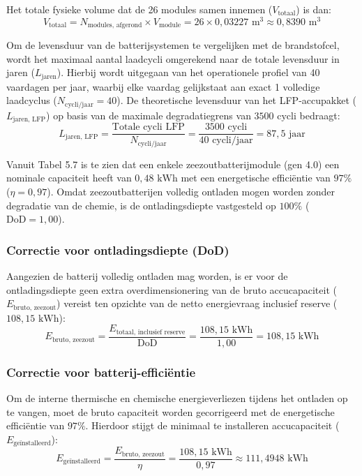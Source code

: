 \noindent Het totale fysieke volume dat de 26 modules samen innemen ($V_{\text{totaal}}$) is dan:
\begin{equation}
V_{\text{totaal}} = N_{\text{modules, afgerond}} \times V_{\text{module}} = 26 \times 0{,}03227 \text{ m}^3 \approx 0{,}8390 \text{ m}^3
\end{equation}

\noindent Om de levensduur van de batterijsystemen te vergelijken met de brandstofcel, wordt het maximaal aantal laadcycli omgerekend naar de totale levensduur in jaren ($L_{\text{jaren}}$). Hierbij wordt uitgegaan van het operationele profiel van 40 vaardagen per jaar, waarbij elke vaardag gelijkstaat aan exact 1 volledige laadcyclus ($N_{\text{cycli/jaar}} = 40$).
De theoretische levensduur van het LFP-accupakket ($L_{\text{jaren, LFP}}$) op basis van de maximale degradatiegrens van $3500 \text{ cycli}$ bedraagt:
\begin{equation}
L_{\text{jaren, LFP}} = \frac{\text{Totale cycli LFP}}{N_{\text{cycli/jaar}}} = \frac{3500 \text{ cycli}}{40 \text{ cycli/jaar}} = 87{,}5 \text{ jaar}
\end{equation}

\noindent Vanuit Tabel 5.7 is te zien dat een enkele zeezoutbatterijmodule (gen 4.0) een nominale capaciteit heeft van $0{,}48 \text{ kWh}$ met een energetische efficiëntie van $97\%$ ($\eta = 0{,}97$). Omdat zeezoutbatterijen volledig ontladen mogen worden zonder degradatie van de chemie, is de ontladingsdiepte vastgesteld op $100\%$ ($\text{DoD} = 1{,}00$).

\subsubsection*{Correctie voor ontladingsdiepte (DoD)}
Aangezien de batterij volledig ontladen mag worden, is er voor de ontladingsdiepte geen extra overdimensionering van de bruto accucapaciteit ($E_{\text{bruto, zeezout}}$) vereist ten opzichte van de netto energievraag inclusief reserve ($108{,}15 \text{ kWh}$):
\begin{equation}
E_{\text{bruto, zeezout}} = \frac{E_{\text{totaal, inclusief reserve}}}{\text{DoD}} = \frac{108{,}15 \text{ kWh}}{1{,}00} = 108{,}15 \text{ kWh}
\end{equation}

\subsubsection*{Correctie voor batterij-efficiëntie}
Om de interne thermische en chemische energieverliezen tijdens het ontladen op te vangen, moet de bruto capaciteit worden gecorrigeerd met de energetische efficiëntie van $97\%$. Hierdoor stijgt de minimaal te installeren accucapaciteit ($E_{\text{geïnstalleerd}}$):
\begin{equation}
E_{\text{geïnstalleerd}} = \frac{E_{\text{bruto, zeezout}}}{\eta} = \frac{108{,}15 \text{ kWh}}{0{,}97} \approx 111{,}4948 \text{ kWh}
\end{equation}

